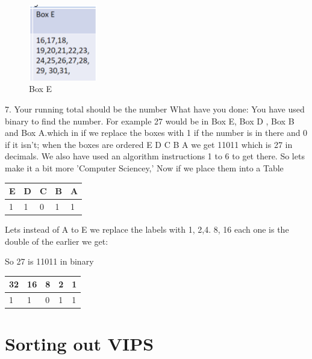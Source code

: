 \begin{figure}
    \centering
    \includegraphics[width=3cm]{chapters/chapterCT1/figures/BoxE.png}
    \caption{Box E}
    \label{fig:Box E}
\end{figure}
7.	Your running total should be the number
What have you done: You have used binary to find the number. For example 27 would be in Box E, Box D , Box B and Box A.which in if we replace the boxes with 1 if the number is in there and 0 if it isn’t; when the boxes are ordered E D C B A we get 11011 which is 27 in decimals. We also have used an algorithm instructions 1 to 6 to get there.
\newline
So lets make it a bit more 'Computer Sciencey,'
Now if we place them into a Table 
\begin{tabular}{lllll} \hline
E & D & C & B & A	 	 \\ \hline
1  & 1  & 0 &  1 & 1\\ \hline

\end{tabular}

Lets instead of A to E we replace the labels with 1, 2,4. 8, 16 each one is the double of the earlier we get:


So 27 is 11011 in binary
\begin{tabular}{lllll} \hline
32 & 16 & 8 & 2 & 1 	 \\ \hline
1  & 1  & 0 &  1 & 1\\ \hline

\end{tabular}

\section{Sorting out VIPS}